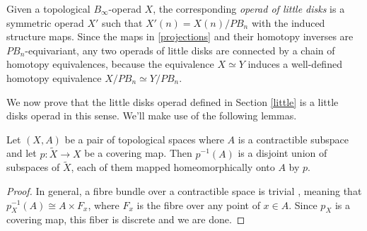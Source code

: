 \documentclass[TFM.tex]{subfiles}
\begin{document}
Given a topological $B_\infty$-operad $X$, the corresponding \emph{operad of little disks} is a symmetric operad $X'$ such that $X'(n)=X(n)/PB_n$ with the induced structure maps. Since the maps in \ref{projections} and their homotopy inverses are $PB_n$-equivariant, any two operads of little disks are connected by a chain of homotopy equivalences, because the equivalence $X\simeq Y$ induces a well-defined homotopy equivalence $X/PB_n\simeq Y/PB_n$. 



We now prove that the little disks operad defined in Section \ref{little} is a little disks operad in this sense. We'll make use of the following lemmas.

\begin{lemma}\label{contractible}
Let $(X,A)$ be a pair of topological spaces where $A$ is a contractible subspace  and let $p:\widetilde{X}\to X$ be a covering map. Then $p^{-1}(A)$ is a disjoint union of subspaces of $\widetilde{X}$, each of them mapped homeomorphically onto $A$ by $p$. 
\end{lemma}
\begin{proof}
In general, a fibre bundle over a contractible space is trivial \cite[Proposition 3.5]{bundle}, meaning that $p_X^{-1}(A)\cong A\times F_{x}$, where $F_x$ is the fibre over any point of $x\in A$. Since $p_X$ is a covering map, this fiber is discrete and we are done. 
\end{proof}
\end{document}
